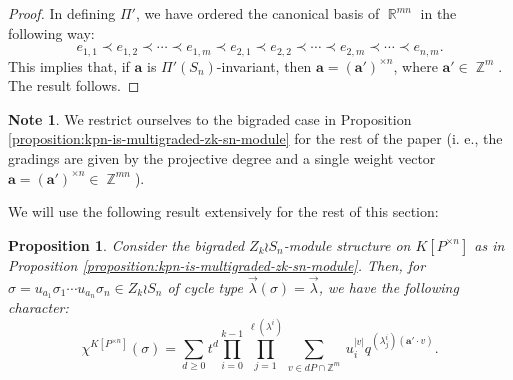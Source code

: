 \documentclass[a4paper,12pt]{amsart}
\theoremstyle{plain}
\newtheorem{proposition}[theorem]{Proposition}
\theoremstyle{definition}
\newtheorem{note}[theorem]{Note}
\theoremstyle{remark}
\DeclareMathOperator{\ZZ}{\mathbb{Z}}
\DeclareMathOperator{\RR}{\mathbb{R}}
\begin{document}
\begin{proof}
In defining $\Pi'$, we have ordered the canonical basis of $\RR^{mn}$ in the following way:
\[
e_{1, 1} \prec e_{1,2} \prec \cdots \prec e_{1, m} \prec e_{2, 1} \prec e_{2, 2} \prec \cdots \prec e_{2, m} \prec  \cdots \prec e_{n, m}.
\]
This implies that, if $\bm{a}$ is $\Pi'(S_n)$-invariant, then $\bm{a} = (\bm{a}')^{\times n}$, where $\bm{a}' \in \ZZ^{m}$. The result follows.
\end{proof}

\begin{note}
    We restrict ourselves to the bigraded case in Proposition \ref{proposition:kpn-is-multigraded-zk-sn-module} for the rest of the paper (i. e., the gradings are given by the projective degree and a single weight vector $\bm{a} = (\bm{a}')^{\times n} \in \ZZ^{mn}$).
\end{note}

We will use the following result extensively for the rest of this section:

\begin{proposition} \label{proposition:polytope-character}
    Consider the bigraded $Z_k \wr S_n$-module structure on $K[P^{\times n}]$ as in Proposition \ref{proposition:kpn-is-multigraded-zk-sn-module}. Then, for $\sigma = u_{a_1}\sigma_1 \cdots u_{a_n}\sigma_n \in Z_k \wr S_n$ of cycle type $\vec{\lambda}(\sigma) = \vec{\lambda}$, we have the following character:
    \[
    \chi^{K[P^{\times n}]}(\sigma) = \sum_{d \geq 0} t^d \prod_{i=0}^{k-1}
    \prod_{j = 1}^{\ell(\lambda^i)} \sum_{v \in dP \cap \mathbb{Z}^m} ~
    u_i^{|v|} q^{(\lambda^i_j) (\bm{a}' \cdot v)}.
    \]
\end{proposition}
\end{document}
